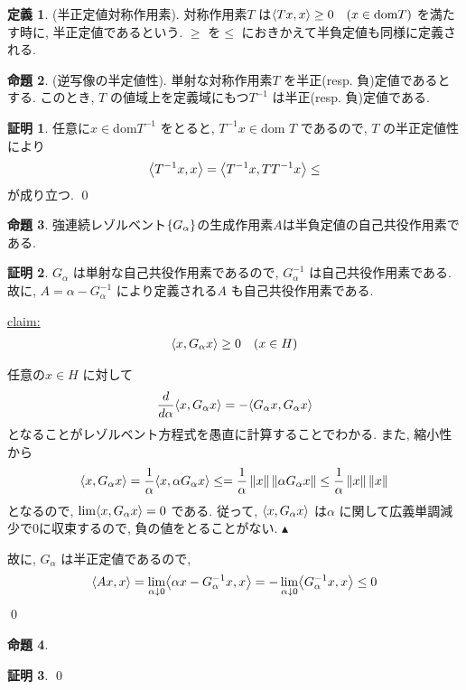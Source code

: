 \documentclass[10pt, fleqn, label-section=none]{bxjsarticle}
\theoremstyle{definition}
\newtheorem{dfn}{定義}[section]
\newtheorem{prop}[dfn]{命題}
\newtheorem*{pf*}{証明}
\newcommand{\cbra}[1]{\mleft\{#1\mright\}}
\newcommand{\tbra}[1]{\mleft\langle#1\mright\rangle}
\newcommand{\norm}[1]{\left\|#1\right\|}
\renewcommand{\;}{\, ; \,}
\newenvironment{claim}[1]{\par\noindent\underline{claim:}\space#1}{}
\newenvironment{claimproof}[1]{\par\noindent{($\because$)}\space#1}{\hfill $\blacktriangle $}
\begin{document}
\begin{dfn}(半正定値対称作用素). 
対称作用素$T$ は$\tbra{Tx, x} \geq 0 \quad(x \in \textrm{dom}T)$ を満たす時に, 半正定値であるという. $\geq$ を$\leq $ におきかえて半負定値も同様に定義される. 
\end{dfn}

\begin{prop}(逆写像の半定値性). 単射な対称作用素$T$ を半正(resp. 負)定値であるとする.  このとき, $T$ の値域上を定義域にもつ$T^{-1}$ は半正(resp. 負)定値である.  
\end{prop}
\begin{pf*} 任意に$x \in \textrm{dom}T^{-1}$ をとると, $T^{-1} x \in \textrm{dom }T$ であるので, $T$ の半正定値性により
\begin{align*} \tbra{T^{-1} x, x} = \tbra{T^{-1} x, T T^{-1} x } \leq \end{align*}
が成り立つ. 
\qed
\end{pf*}


\begin{prop}
強連続レゾルベント$\cbra{G_\alpha}$の生成作用素$A$は半負定値の自己共役作用素である. 
\end{prop}
\begin{pf*}
$G_\alpha$ は単射な自己共役作用素であるので, $G_\alpha ^{-1}$ は自己共役作用素である. 故に, $A = \alpha - G_{\alpha } ^{-1} $ により定義される$A$ も自己共役作用素である. 
\begin{claim}
\begin{align*} \tbra{x, G_\alpha x} \geq 0  \quad (x \in H)\end{align*}
\end{claim}
\begin{claimproof}任意の$x \in H$ に対して
\begin{align*} \frac{d}{d\alpha} \tbra{x, G_\alpha x} = - \tbra{G_\alpha x, G_\alpha x} \end{align*}
となることがレゾルベント方程式を愚直に計算することでわかる. また, 縮小性から
\begin{align*} \tbra{x, G_\alpha x}  = \frac{1}{\alpha} \tbra{x, \alpha G_\alpha x} \leq = \frac{1}{\alpha} \norm{x} \norm{\alpha G_\alpha x} \leq  \frac{1}{\alpha} \norm{x} \norm{x}\end{align*}
となるので, $\lim \tbra{x, G_\alpha x} = 0$ である. 従って, $\tbra{x, G_\alpha x}$ は$\alpha $ に関して広義単調減少で$0$に収束するので, 負の値をとることがない. 
\end{claimproof}

故に, $G_\alpha $ は半正定値であるので, 
\begin{align*} \tbra{Ax, x} = \lim_{\alpha \downarrow 0}    \tbra{\alpha x - G_\alpha ^{-1} x , x} = -   \lim_{\alpha \downarrow 0}  \tbra{G_\alpha ^{-1} x , x} \leq 0 \end{align*}
\qed
\end{pf*}

\begin{prop}

\end{prop}
\begin{pf*}

\qed
\end{pf*}
\end{document}
